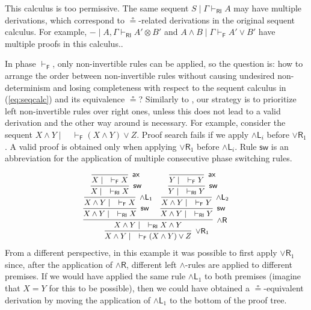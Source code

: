 \documentclass[submission,copyright,creativecommons]{eptcs}
\theoremstyle{definition}
\newcommand{\andlone}{\land \mathsf{L}_{1}}
\newcommand{\andltwo}{\land \mathsf{L}_{2}}
\newcommand{\andli}{\land \mathsf{L}_{i}}
\newcommand{\andr}{\land \mathsf{R}}
\newcommand{\orrone}{\lor \mathsf{R}_{1}}
\newcommand{\ax}{\mathsf{ax}}
\newcommand{\ot}{\otimes}
\newcommand{\RI}{\mathsf{RI}}
\newcommand{\F}{\mathsf{F}}
\newcommand{\sw}{\mathsf{sw}}
\newcommand\niccolo[1]{\mbox{}
{\marginpar{\color{red}NV}}
{\sf\noindent\color{red}#1}}%
\begin{document}
This calculus is too permissive. The same sequent $S \mid \Gamma \vdash_{\RI} A$ may have multiple derivations, which correspond to $\circeq$-related derivations in the original sequent calculus. For example, $- \mid A , \Gamma \vdash_{\RI} A' \ot B'$ and $A \land B \mid \Gamma \vdash_{\F} A' \lor B'$ have multiple proofs in this calculus..

In phase $\vdash_\F$, only non-invertible rules can be applied, so the question is: how to arrange the order between non-invertible rules without causing undesired non-determinism and losing completeness with respect to the sequent calculus in (\ref{eq:seqcalc}) and its equivalence $\circeq$? Similarly to \cite{UVW:protsn}, our strategy is to prioritize left non-invertible rules over right ones, unless this does not lead to a valid derivation and the other way around is necessary.
For example, consider the sequent $X \land Y \mid \quad \vdash_{\F} (X \land Y) \lor Z$. Proof search fails if we apply $\andli$ before $\orrone$. A valid proof is obtained only when applying $\orrone$ before $\andli$. Rule $\sw$ is an abbreviation for the application of multiple consecutive phase switching rules.


\begin{equation}\label{eq:ex:focused}
  \small
  \begin{array}{c}
     \infer[\orrone]{X \land Y \mid \quad \vdash_\F (X \land Y) \lor Z}{
      \infer[\andr]{X \land Y \mid \quad \vdash_\RI X \land Y}{
        \infer[\sw]{X \land Y \mid \quad \vdash_\RI X}{
          \infer[\andlone]{X \land Y \mid \quad \vdash_\F X}{
          \infer[\sw]{X \mid \quad \vdash_\RI X}{
          \infer[\ax]{X \mid \quad \vdash_\F X}{}
        }}}
        &
        \infer[\sw]{X \land Y \mid \quad \vdash_\RI Y}{
        \infer[\andltwo]{X \land Y \mid \quad \vdash_\F Y}{
          \infer[\sw]{Y \mid \quad \vdash_\RI Y}{
          \infer[\ax]{Y \mid \quad \vdash_\F Y}{}
        }}}
      }
    }
  \end{array}
\end{equation}
From a different perspective, in this example it was possible to first apply $\orrone$ since, after the application of $\andr$, different left $\land$-rules are applied to different premises. If we would have applied  the same rule $\andlone$ to both premises (imagine that $X = Y$ for this to be possible), then we could have obtained a $\circeq$-equivalent derivation by moving the application of $\andlone$ to the bottom of the proof tree. 
\end{document}

